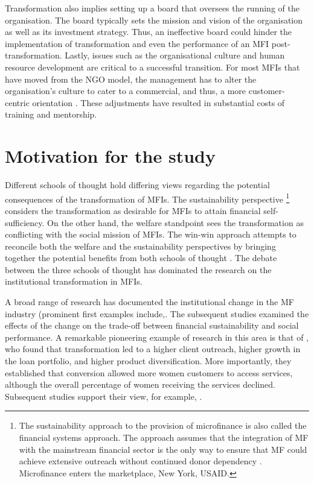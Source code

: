 \documentclass[a4paper, nobind]{templates/ociamthesis}
\begin{document}
Transformation also implies setting up a board that oversees the running of the organisation. The board typically sets the mission and vision of the organisation as well as its investment strategy. Thus, an ineffective board could hinder the implementation of transformation \autocite{campion1999institutional} and even the performance of an MFI post-transformation. Lastly, issues such as the organisational culture and human resource development are critical to a successful transition. For most MFIs that have moved from the NGO model, the management has to alter the organisation's culture to cater to a commercial, and thus, a more customer-centric orientation \autocite{christen2001commercialization}. These adjustments have resulted in substantial costs of training and mentorship.

\hypertarget{motivation-for-the-study}{%
\section{Motivation for the study}\label{motivation-for-the-study}}

\noindent Different schools of thought hold differing views regarding the potential consequences of the transformation of MFIs. The sustainability perspective \footnote{The sustainability approach to the provision of microfinance is also called the financial systems approach. The approach assumes that the integration of MF with the mainstream financial sector is the only way to ensure that MF could achieve extensive outreach without continued donor dependency \autocite{rhyne1999microfinance}. Microfinance enters the marketplace, New York, USAID.} considers the transformation as desirable for MFIs to attain financial self-sufficiency. On the other hand, the welfare standpoint sees the transformation as conflicting with the social mission of MFIs. The win-win approach attempts to reconcile both the welfare and the sustainability perspectives by bringing together the potential benefits from both schools of thought \autocite{kodongo2013individual}. The debate between the three schools of thought has dominated the research on the institutional transformation in MFIs.

A broad range of research has documented the institutional change in the MF industry (prominent first examples include,\autocite{ledgerwood1998microfinance,ledgerwood2006transforming}. The subsequent studies examined the effects of the change on the trade-off between financial sustainability and social performance. A remarkable pioneering example of research in this area is that of \textcite{frank2008stemming}, who found that transformation led to a higher client outreach, higher growth in the loan portfolio, and higher product diversification. More importantly, they established that conversion allowed more women customers to access services, although the overall percentage of women receiving the services declined. Subsequent studies support their view, for example, \autocites[ ]{hartarska2012governance,bos2015practice}{d2017ngos}.
\end{document}
